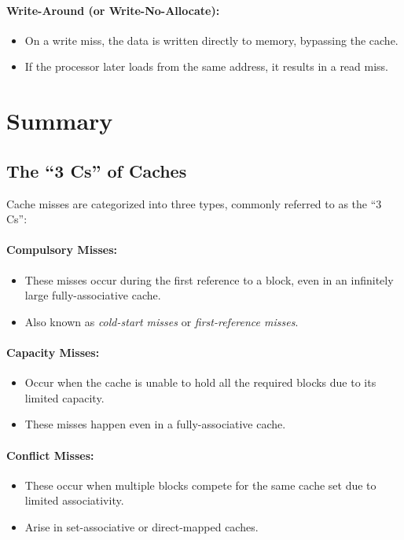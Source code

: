 \paragraph{Write-Around (or Write-No-Allocate):}
\begin{itemize}
    \item On a write miss, the data is written directly to memory, bypassing the cache.
    \item If the processor later loads from the same address, it results in a read miss.
\end{itemize}


\newpage
\section{Summary}
\subsection{The ``3 Cs'' of Caches}

Cache misses are categorized into three types, commonly referred to as the ``3 Cs'':

\paragraph{Compulsory Misses:}
\begin{itemize}
    \item These misses occur during the first reference to a block, even in an infinitely large fully-associative cache.
    \item Also known as \textit{cold-start misses} or \textit{first-reference misses}.
\end{itemize}

\paragraph{Capacity Misses:}
\begin{itemize}
    \item Occur when the cache is unable to hold all the required blocks due to its limited capacity.
    \item These misses happen even in a fully-associative cache.
\end{itemize}

\paragraph{Conflict Misses:}
\begin{itemize}
    \item These occur when multiple blocks compete for the same cache set due to limited associativity.
    \item Arise in set-associative or direct-mapped caches.
\end{itemize}

